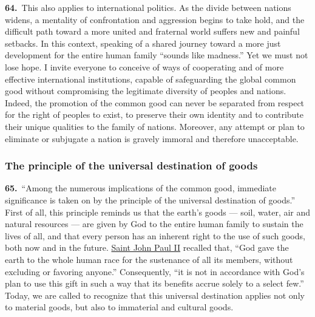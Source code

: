 \documentclass{article}
\begin{document}
\textbf{64.}\ This also applies to international politics. As the divide between nations widens, a mentality of confrontation and aggression begins to take hold, and the difficult path toward a more united and fraternal world suffers new and painful setbacks. In this context, speaking of a shared journey toward a more just development for the entire human family ``sounds like madness.''\cite{n83} Yet we must not lose hope. I invite everyone to conceive of ways of cooperating and of more effective international institutions, capable of safeguarding the global common good without compromising the legitimate diversity of peoples and nations. Indeed, the promotion of the common good can never be separated from respect for the right of peoples to exist, to preserve their own identity and to contribute their unique qualities to the family of nations.\cite{n84} Moreover, any attempt or plan to eliminate or subjugate a nation is gravely immoral and therefore unacceptable.

\subsubsection{The principle of the universal destination of goods}

\textbf{65.}\ ``Among the numerous implications of the common good, immediate significance is taken on by the principle of the universal destination of goods.''\cite{n85} First of all, this principle reminds us that the earth's goods --- soil, water, air and natural resources --- are given by God to the entire human family to sustain the lives of all, and that every person has an inherent right to the use of such goods, both now and in the future. \href{https://www.vatican.va/content/john-paul-ii/en.html}{Saint John Paul II} recalled that, ``God gave the earth to the whole human race for the sustenance of all its members, without excluding or favoring anyone.''\cite{n86} Consequently, ``it is not in accordance with God's plan to use this gift in such a way that its benefits accrue solely to a select few.''\cite{n87} Today, we are called to recognize that this universal destination applies not only to material goods, but also to immaterial and cultural goods.
\end{document}
